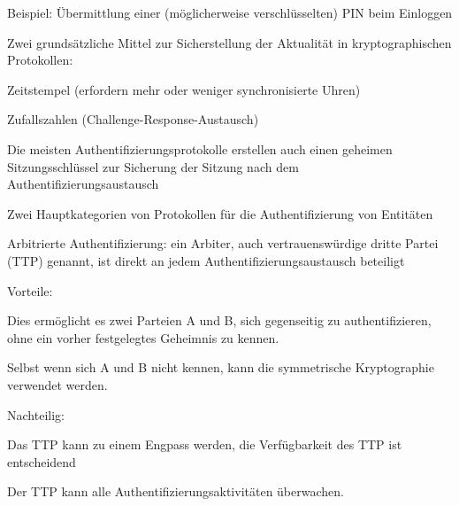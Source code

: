 \documentclass[a4paper]{article}
\begin{document}
\begin{multicols}{3}
\begin{itemize*}
\begin{itemize*}
\begin{itemize*}
                        \item Beispiel: Übermittlung einer (möglicherweise verschlüsselten) PIN beim Einloggen
                  \end{itemize*}
                  \item Zwei grundsätzliche Mittel zur Sicherstellung der Aktualität in kryptographischen Protokollen:
                  \begin{itemize*}
                        \item Zeitstempel (erfordern mehr oder weniger synchronisierte Uhren)
                        \item Zufallszahlen (Challenge-Response-Austausch)
                  \end{itemize*}
            \end{itemize*}
            \item Die meisten Authentifizierungsprotokolle erstellen auch einen geheimen Sitzungsschlüssel zur Sicherung der Sitzung nach dem Authentifizierungsaustausch
            \item Zwei Hauptkategorien von Protokollen für die Authentifizierung von Entitäten
            \begin{itemize*}
                  \item Arbitrierte Authentifizierung: ein Arbiter, auch vertrauenswürdige dritte Partei (TTP) genannt, ist direkt an jedem Authentifizierungsaustausch beteiligt
                  \begin{itemize*}
                        \item Vorteile:
                        \begin{itemize*}
                              \item Dies ermöglicht es zwei Parteien A und B, sich gegenseitig zu authentifizieren, ohne ein vorher festgelegtes Geheimnis zu kennen.
                              \item Selbst wenn sich A und B nicht kennen, kann die symmetrische Kryptographie verwendet werden.
                        \end{itemize*}
                        \item Nachteilig:
                        \begin{itemize*}
                              \item Das TTP kann zu einem Engpass werden, die Verfügbarkeit des TTP ist entscheidend
                              \item Der TTP kann alle Authentifizierungsaktivitäten überwachen.

\end{itemize*}
\end{itemize*}
\end{itemize*}
\end{itemize*}
\end{multicols}
\end{document}
